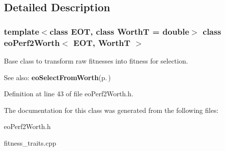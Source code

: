 \subsection{Detailed Description}
\subsubsection*{template$<$class EOT, class Worth\-T = double$>$ class eo\-Perf2Worth$<$ EOT, Worth\-T $>$}

Base class to transform raw fitnesses into fitness for selection. 

\begin{Desc}
\item[See also:]{\bf eo\-Select\-From\-Worth}{\rm (p.\,\pageref{classeo_select_from_worth})} \end{Desc}




Definition at line 43 of file eo\-Perf2Worth.h.

The documentation for this class was generated from the following files:\begin{CompactItemize}
\item 
eo\-Perf2Worth.h\item 
fitness\_\-traits.cpp\end{CompactItemize}
